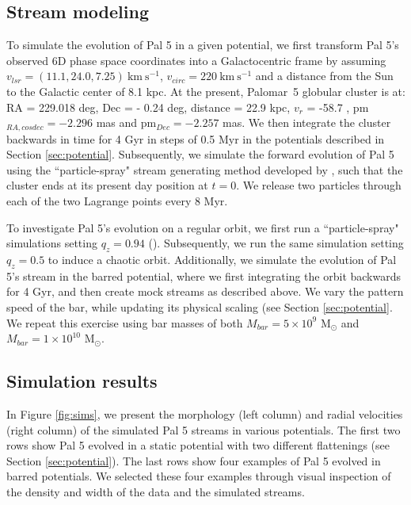 \documentclass[twocolumn]{aastex62}
\newcommand{\msun}{\textrm{M}_\odot}
\newcommand{\kms}{\ensuremath{\textrm{km}~\textrm{s}^{-1}}}
\begin{document}
\subsection{Stream modeling}
\label{sec:modeling}
To simulate the evolution of Pal 5 in a given potential, we first transform Pal 5's observed 6D phase space coordinates into a Galactocentric frame by assuming $v_{lsr} = (11.1, 24.0, 7.25) ~\kms$,  $v_{circ} = 220  ~\kms$ and a distance from the Sun to the Galactic center of 8.1 kpc.
At the present, Palomar~5 globular cluster is at: RA = 229.018 deg, Dec = - 0.24 deg, distance = 22.9 kpc, $v_r$ = -58.7 , pm$_{RA,cosdec}= -2.296$ mas and pm$_{Dec} = -2.257$ mas.
We then integrate the cluster backwards in time for 4 Gyr in steps of 0.5 Myr in the potentials described in Section \ref{sec:potential}.
Subsequently, we simulate the forward evolution of Pal 5 using the ``particle-spray" stream generating method developed by \citet{Fardal:2015}, such that the cluster ends at its present day position at $t = 0$.
We release two particles through each of the two Lagrange points every 8 Myr.

To investigate Pal 5's evolution on a regular orbit, we first run a ``particle-spray" simulations setting $q_z = 0.94$ (\citealt{Bovy:2016}).
Subsequently, we run the same simulation setting $q_z = 0.5$ to induce a chaotic orbit.
Additionally, we simulate the evolution of Pal 5's stream in the barred potential, where we first integrating the orbit backwards for 4 Gyr, and then create mock streams as described above.
We vary the pattern speed of the bar, while updating its physical scaling (see Section \ref{sec:potential}. %
We repeat this exercise using bar masses of both $M_{bar} = 5 \times 10^{9}$ $\msun$ and $M_{bar} = 1 \times 10^{10}$ $\msun$.

\subsection{Simulation results}
\label{sec:sim_results}
In Figure \ref{fig:sims}, we present the morphology (left column) and radial velocities (right column) of the simulated Pal 5 streams in various potentials.
The first two rows show Pal 5 evolved in a static potential with two different flattenings (see Section \ref{sec:potential}).
The last rows show four examples of Pal 5 evolved in barred potentials.
We selected these four examples through visual inspection of the density and width of the data and the simulated streams.
\end{document}
